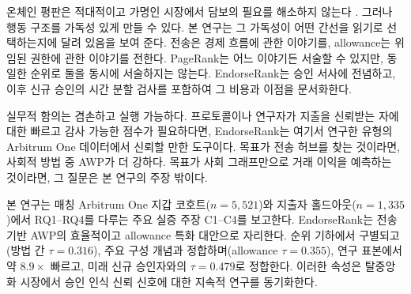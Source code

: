 
온체인 평판은 적대적이고 가명인 시장에서 담보의 필요를 해소하지 않는다 . 그러나 행동 구조를 가독성 있게 만들 수 있다. 본 연구는 그 가독성이 어떤 간선을 읽기로 선택하는지에 달려 있음을 보여 준다. 전송은 경제 흐름에 관한 이야기를, allowance는 위임된 권한에 관한 이야기를 전한다. PageRank는 어느 이야기든 서술할 수 있지만, 동일한 순위로 둘을 동시에 서술하지는 않는다. EndorseRank는 승인 서사에 전념하고, 이후 신규 승인의 시간 분할 검사를 포함하여 그 비용과 이점을 문서화한다.

실무적 함의는 겸손하고 실행 가능하다. 프로토콜이나 연구자가 지출을 신뢰받는 자에 대한 빠르고 감사 가능한 점수가 필요하다면, EndorseRank는 여기서 연구한 유형의 Arbitrum One 데이터에서 신뢰할 만한 도구이다. 목표가 전송 허브를 찾는 것이라면, 사회적 방법 중 AWP가 더 강하다. 목표가 사회 그래프만으로 거래 이익을 예측하는 것이라면, 그 질문은 본 연구의 주장 밖이다.

본 연구는 매칭 Arbitrum One 지갑 코호트($n=5{,}521$)와 지출자 홀드아웃($n=1{,}335$)에서 RQ1--RQ4를 다루는 주요 실증 주장 C1--C4를 보고한다. EndorseRank는 전송 기반 AWP의 효율적이고 allowance 특화 대안으로 자리한다. 순위 기하에서 구별되고(방법 간 $\tau=0.316$), 주요 구성 개념과 정합하며(allowance $\tau=0.355$), 연구 표본에서 약 $8.9\times$ 빠르고, 미래 신규 승인자와의 $\tau=0.479$로 정합한다. 이러한 속성은 탈중앙화 시장에서 승인 인식 신뢰 신호에 대한 지속적 연구를 동기화한다.
